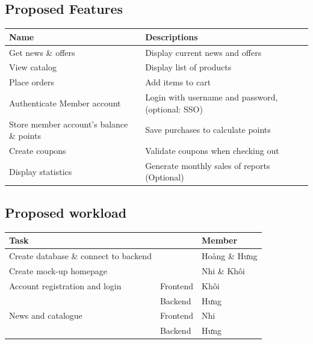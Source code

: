 \documentclass[a4paper]{article}
\numberwithin{equation}{section}
\begin{document}
\subsection{Proposed Features}
\begin{center}
  \begin{tabular}{*{2}{l}}
    \toprule
    Name                                     & Descriptions                                      \\
    \midrule
    Get news \& offers                       & Display current news and offers                   \\
    View catalog                             & Display list of products                          \\
    Place orders                             & Add items to cart                                 \\
    Authenticate Member account              & Login with username and password, (optional: SSO) \\
    Store member account's balance \& points & Save  purchases to calculate points               \\
    Create coupons                           & Validate coupons when checking out                \\
    Display statistics                       & Generate monthly sales of reports (Optional)      \\
    \bottomrule
  \end{tabular}
\end{center}

\subsection{Proposed workload}
\begin{center}
  \begin{tabular}{*{3}{l}}
    \toprule
    Task                                  &          & Member        \\
    \midrule
    Create database \& connect to backend &          & Hoàng \& Hưng \\
    Create mock-up homepage               &          & Nhi \& Khôi   \\
    Account registration and login        & Frontend & Khôi          \\
                                          & Backend  & Hưng          \\
    News and catalogue                    & Frontend & Nhi           \\
                                          & Backend  & Hưng          \\
    \bottomrule
  \end{tabular}
\end{center}
\end{document}
